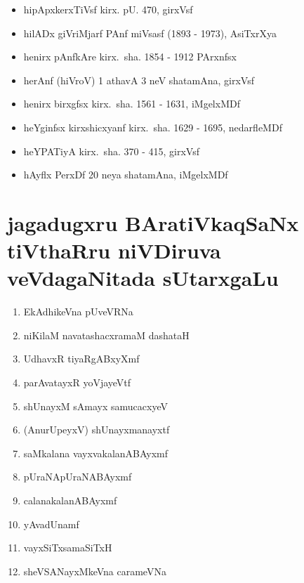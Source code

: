 {\begin{itemize}
\item hipApxkerxTiVsf kirx. pU. {\rm 470}, girxVsf
\item hilADx giVriMjarf PAnf miVsasf {\rm (1893 - 1973)}, AsiTxrXya
\item henirx pAnfkAre kirx.~sha. {\rm 1854 - 1912} PArxnfsx
\item herAnf (hiVroV) {\rm 1} athavA {\rm 3} neV shatamAna, girxVsf
\item henirx birxgfsx kirx.~sha. {\rm 1561 - 1631}, iMgelxMDf
\item heYginfsx kirxshicxyanf kirx.~sha. {\rm 1629 - 1695}, nedarfleMDf
\item heYPATiyA kirx.~sha. {\rm 370 - 415}, girxVsf
\item hAyflx PerxDf {\rm 20} neya shatamAna, iMgelxMDf
\end{itemize}

\newpage
\section*{jagadugxru BAratiVkaqSaNx tiVthaRru niVDiruva veVdagaNitada sUtarxgaLu}

\begin{enumerate}[\rm 1)]
\item EkAdhikeVna pUveVRNa

\item niKilaM navatashacxramaM dashataH

\item UdhavxR tiyaRgABxyXmf 

\item parAvatayxR yoVjayeVtf 

\item shUnayxM sAmayx samucacxyeV

\item (AnurUpeyxV) shUnayxmanayxtf

\item saMkalana vayxvakalanABAyxmf

\item pUraNApUraNABAyxmf

\item calanakalanABAyxmf

\item yAvadUnamf

\item vayxSiTxsamaSiTxH

\item sheVSANayxMkeVna carameVNa


\end{enumerate}}

